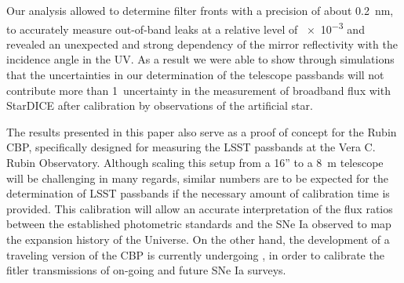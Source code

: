Our analysis allowed to determine filter fronts with a precision of
about \SI{0.2}{\nano\meter}, to accurately measure out-of-band leaks at a relative
level of \num{e-3} and revealed an unexpected and strong dependency of
the mirror reflectivity with the incidence angle in the UV. As a
result we were able to show through simulations that the uncertainties in our determination of the
telescope passbands will not contribute more than 1\textperthousand\
uncertainty in the measurement of broadband flux with StarDICE after
calibration by observations of the artificial star. 

The results presented in this paper also serve as a proof of concept for the Rubin CBP, specifically designed for measuring the LSST passbands at the Vera C. Rubin Observatory. Although scaling this setup from a 16'' to a \SI{8}{\meter} telescope will be challenging in many regards, similar numbers are to be expected for the determination of LSST passbands if the necessary amount of calibration time is provided. This calibration will allow an accurate interpretation of the flux ratios between the established photometric standards and the SNe Ia observed to map the expansion history of the Universe. On the other hand, the development of a traveling version of the CBP is currently undergoing \citep{2024RASTI...3..125S}, in order to calibrate the fitler transmissions of on-going and future SNe Ia surveys.

